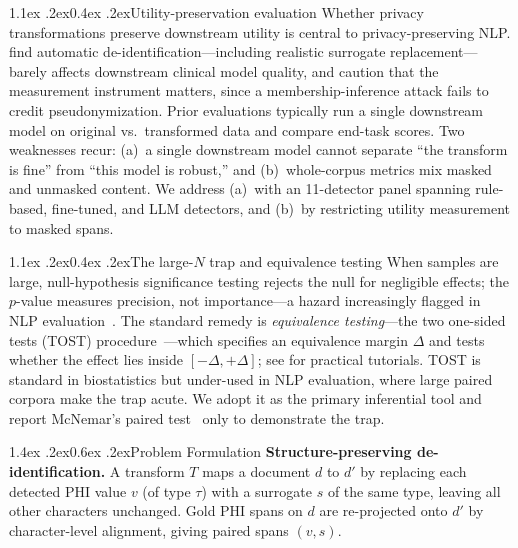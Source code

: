 \documentclass[11pt]{article}
\makeatletter
\renewcommand\section{\@startsection{section}{1}{\z@}%
  {1.4ex \@plus.2ex}{0.6ex \@plus.2ex}{\normalfont\large\bfseries}}
\renewcommand\subsection{\@startsection{subsection}{2}{\z@}%
  {1.1ex \@plus.2ex}{0.4ex \@plus.2ex}{\normalfont\normalsize\bfseries}}
\makeatother
\begin{document}
\subsection{Utility-preservation evaluation}
Whether privacy transformations preserve downstream utility is central to privacy-preserving NLP. \citet{vakili2022downstream} find automatic de-identification---including realistic surrogate replacement---barely affects downstream clinical model quality, and \citet{vakili2023mia} caution that the measurement instrument matters, since a membership-inference attack fails to credit pseudonymization. Prior evaluations typically run a single downstream model on original vs.\ transformed data and compare end-task scores. Two weaknesses recur: (a)~a single downstream model cannot separate ``the transform is fine'' from ``this model is robust,'' and (b)~whole-corpus metrics mix masked and unmasked content. We address (a)~with an 11-detector panel spanning rule-based, fine-tuned, and LLM detectors, and (b)~by restricting utility measurement to masked spans.

\subsection{The large-$N$ trap and equivalence testing}
When samples are large, null-hypothesis significance testing rejects the null for negligible effects; the $p$-value measures precision, not importance---a hazard increasingly flagged in NLP evaluation~\citep{dror2018hitchhiker,card2020power}. The standard remedy is \emph{equivalence testing}---the two one-sided tests (TOST) procedure~\citep{schuirmann1987tost,berger1996bioequivalence}---which specifies an equivalence margin $\Delta$ and tests whether the effect lies inside $[-\Delta,+\Delta]$; see \citet{lakens2017tost,lakens2018equivalence} for practical tutorials. TOST is standard in biostatistics but under-used in NLP evaluation, where large paired corpora make the trap acute. We adopt it as the primary inferential tool and report McNemar's paired test~\citep{mcnemar1947} only to demonstrate the trap.

\section{Problem Formulation}
\textbf{Structure-preserving de-identification.} A transform $T$ maps a document $d$ to $d'$ by replacing each detected PHI value $v$ (of type $\tau$) with a surrogate $s$ of the same type, leaving all other characters unchanged. Gold PHI spans on $d$ are re-projected onto $d'$ by character-level alignment, giving paired spans $(v,s)$.
\end{document}
